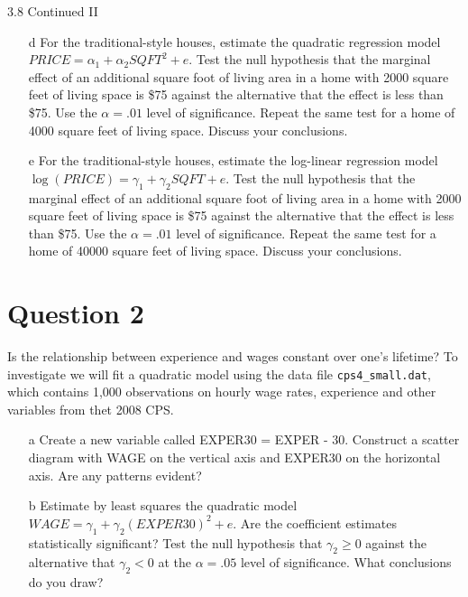 \documentclass[xcolor={dvipsnames}]{beamer}
\begin{document}
\begin{frame}{3.8 Continued II}

\begin{itemize}[<+->]
	
	
	
	\item[d] For the traditional-style houses, estimate the quadratic regression model $PRICE = \alpha_1 + \alpha_2 SQFT^2 + e$. Test the null hypothesis that the marginal effect of an additional square foot of living area in a home with 2000 square feet of living space is \$75 against the alternative that the effect is less than \$75. Use the $\alpha = .01$ level of significance. Repeat the same test for a home of 4000 square feet of living space. Discuss your conclusions.
	
	\item[e] For the traditional-style houses, estimate the log-linear regression model $\log(PRICE) = \gamma_1 + \gamma_2 SQFT + e$. Test the null hypothesis that the marginal effect of an additional square foot of living area in a home with 2000 square feet of living space is \$75 against the alternative that the effect is less than \$75. Use the $\alpha = .01$ level of significance. Repeat the same test for a home of 40000 square feet of living space. Discuss your conclusions.
\end{itemize}

\end{frame}



\section{Question 2}

\AtBeginSection

\begin{frame}{3.12}


	Is the relationship between experience and wages constant over one's lifetime? To investigate we will fit a quadratic model using the data file \texttt{cps4\_small.dat}, which contains 1,000 observations on hourly wage rates, experience and other variables from thet 2008 CPS.
	\begin{itemize}[<+->]
	\item[a] Create a new variable called EXPER30 = EXPER - 30. Construct a scatter diagram with WAGE on the vertical axis and EXPER30 on the horizontal axis. Are any patterns evident?
	
	\item[b] Estimate by least squares the quadratic model $WAGE = \gamma_1 + \gamma_2(EXPER30)^2 + e$. Are the coefficient estimates statistically significant? Test the null hypothesis that $\gamma_2 \ge 0$ against the alternative that $\gamma_2 < 0$ at the $\alpha = .05$ level of significance. What conclusions do you draw?
\end{itemize}	
\end{frame}
\end{document}
